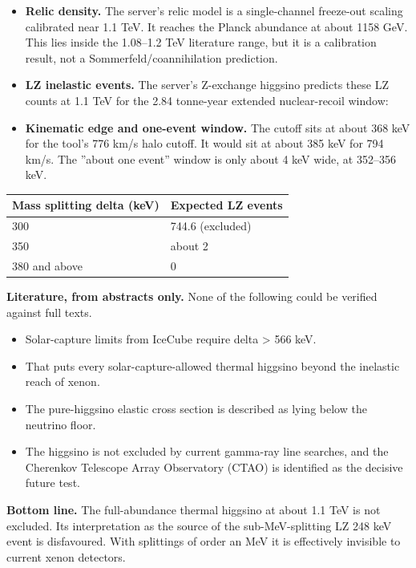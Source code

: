 \documentclass[11pt,a4paper]{article}
\begin{document}
\begin{itemize}
  \item \textbf{Relic density.} The server's relic model is a single-channel freeze-out scaling calibrated near 1.1 TeV. It reaches the Planck abundance at about 1158 GeV. This lies inside the 1.08--1.2 TeV literature range, but it is a calibration result, not a Sommerfeld/coannihilation prediction.
  \item \textbf{LZ inelastic events.} The server's Z-exchange higgsino predicts these LZ counts at 1.1 TeV for the 2.84 tonne-year extended nuclear-recoil window:
\end{itemize}
\begin{itemize}
  \item \textbf{Kinematic edge and one-event window.} The cutoff sits at about 368 keV for the tool's 776 km/s halo cutoff. It would sit at about 385 keV for 794 km/s. The ''about one event'' window is only about 4 keV wide, at 352--356 keV.
\end{itemize}
\begin{longtable}{@{}p{}p{}@{}}
\toprule
\textbf{Mass splitting delta (keV)} & \textbf{Expected LZ events} \\ \midrule \endhead
300 & 744.6 (excluded) \\
350 & about 2 \\
380 and above & 0 \\
\bottomrule\end{longtable}
\textbf{Literature, from abstracts only.} None of the following could be verified against full texts.

\begin{itemize}
  \item Solar-capture limits from IceCube require delta \textgreater{} 566 keV.
  \item That puts every solar-capture-allowed thermal higgsino beyond the inelastic reach of xenon.
  \item The pure-higgsino elastic cross section is described as lying below the neutrino floor.
  \item The higgsino is not excluded by current gamma-ray line searches, and the Cherenkov Telescope Array Observatory (CTAO) is identified as the decisive future test.
\end{itemize}
\textbf{Bottom line.} The full-abundance thermal higgsino at about 1.1 TeV is not excluded. Its interpretation as the source of the sub-MeV-splitting LZ 248 keV event is disfavoured. With splittings of order an MeV it is effectively invisible to current xenon detectors.
\end{document}
